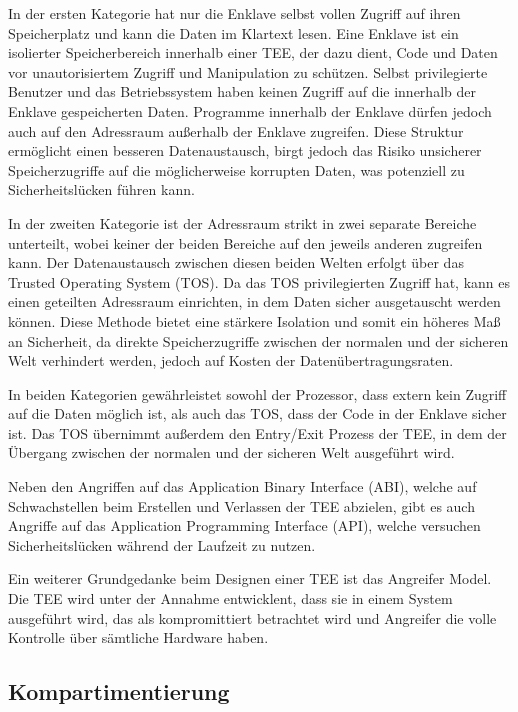 In der ersten Kategorie hat nur die Enklave selbst vollen Zugriff auf ihren Speicherplatz und kann die Daten im Klartext lesen. 
Eine Enklave ist ein isolierter Speicherbereich innerhalb einer TEE, der dazu dient, Code und Daten vor unautorisiertem Zugriff und Manipulation zu schützen.
Selbst privilegierte Benutzer und das Betriebssystem haben keinen Zugriff auf die innerhalb der Enklave gespeicherten Daten. 
Programme innerhalb der Enklave dürfen jedoch auch auf den Adressraum außerhalb der Enklave zugreifen. 
Diese Struktur ermöglicht einen besseren Datenaustausch, birgt jedoch das Risiko unsicherer Speicherzugriffe auf die möglicherweise korrupten Daten, was potenziell zu Sicherheitslücken führen kann.

In der zweiten Kategorie ist der Adressraum strikt in zwei separate Bereiche unterteilt, wobei keiner der beiden Bereiche auf den jeweils anderen zugreifen kann. 
Der Datenaustausch zwischen diesen beiden Welten erfolgt über das Trusted Operating System (TOS). 
Da das TOS privilegierten Zugriff hat, kann es einen geteilten Adressraum einrichten, in dem Daten sicher ausgetauscht werden können. 
Diese Methode bietet eine stärkere Isolation und somit ein höheres Maß an Sicherheit, da direkte Speicherzugriffe zwischen der normalen und der sicheren Welt verhindert werden, jedoch auf Kosten der Datenübertragungsraten.

In beiden Kategorien gewährleistet sowohl der Prozessor, dass extern kein Zugriff auf die Daten möglich ist, als auch das TOS, dass der Code in der Enklave sicher ist. Das TOS übernimmt außerdem den Entry/Exit Prozess der TEE, in dem der Übergang zwischen der normalen und der sicheren Welt ausgeführt wird. 

Neben den Angriffen auf das Application Binary Interface (ABI), welche auf Schwachstellen beim Erstellen und Verlassen der TEE abzielen, gibt es auch Angriffe auf das Application Programming Interface (API), welche versuchen Sicherheitslücken während der Laufzeit zu nutzen\cite{TEEPaper}.

Ein weiterer Grundgedanke beim Designen einer TEE ist das Angreifer Model. Die TEE wird unter der Annahme entwicklent, dass sie in einem System ausgeführt wird, das als kompromittiert betrachtet wird und Angreifer die volle Kontrolle über sämtliche Hardware haben.


\subsection{Kompartimentierung}

